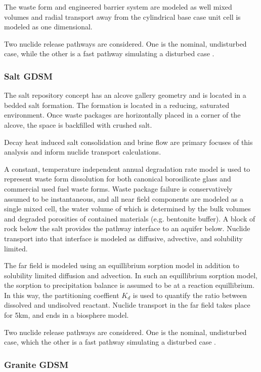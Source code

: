 {The waste form and engineered barrier system are modeled as well mixed volumes 
and radial transport away from the cylindrical base case unit cell is modeled as  
one dimensional.

Two nuclide release pathways are considered. One is the nominal, undisturbed 
case, while the other is a fast pathway simulating a disturbed case
\cite{clayton_generic_2011}.


\subsubsection{Salt GDSM}

The salt repository concept has an alcove gallery geometry and is located in a 
bedded salt formation. The formation is located in a reducing, saturated 
environment. Once waste packages  are horizontally placed in a corner of the 
alcove, the space is backfilled with crushed salt. 

Decay heat induced salt consolidation and brine flow are primary focuses of 
this analysis and inform nuclide transport calculations. 

A constant, temperature independent annual degradation rate model is used to 
represent waste form dissolution for both canonical borosilicate glass and 
commercial used fuel waste forms. Waste package failure is conservatively 
assumed to be instantaneous, and all near field components are modeled as a 
single mixed cell, the water volume of which is determined by the bulk volumes 
and degraded porosities of contained materials (e.g. bentonite buffer). A block  
of rock below the salt provides the pathway interface to an aquifer below. 
Nuclide transport into that interface is modeled as diffusive, advective, and 
solubility limited.

The far field is modeled using an equillibrium sorption model in addition 
to solubility limited diffusion and advection. In such an equillibrium sorption 
model, the sorption to precipitation balance is assumed to be at a 
reaction equillibrium. In this way, the partitioning coeffient $K_d$ is used to 
quantify the ratio between dissolved and undisolved reactant. Nuclide transport
in the far field takes place for 5km, and ends in a biosphere model. 

Two nuclide release pathways are considered. One is the nominal, undisturbed 
case, which the other is a fast pathway simulating a disturbed case
\cite{clayton_generic_2011}.

\subsubsection{Granite GDSM}

}
